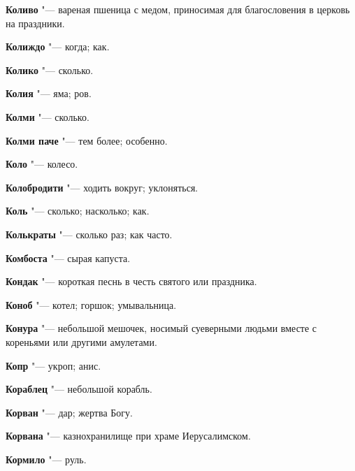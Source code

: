 \begin{mymulticols}{2}
\noindent\textbf{Коливо} "--- вареная пшеница с медом, приносимая для благословения в церковь на праздники. 




\noindent\textbf{Колиждо} "--- когда; как. 




\noindent\textbf{Колико} "--- сколько. 




\noindent\textbf{Колия} "--- яма; ров. 




\noindent\textbf{Колми} "--- сколько. 




\noindent\textbf{Колми паче} "--- тем более; особенно. 




\noindent\textbf{Коло} "--- колесо. 




\noindent\textbf{Колобродити} "--- ходить вокруг; уклоняться. 




\noindent\textbf{Коль} "--- сколько; насколько; как. 




\noindent\textbf{Колькраты} "--- сколько раз; как часто. 




\noindent\textbf{Комбоста} "--- сырая капуста. 




\noindent\textbf{Кондак} "--- короткая песнь в честь святого или праздника. 




\noindent\textbf{Коноб} "--- котел; горшок; умывальница. 




\noindent\textbf{Конура} "--- небольшой мешочек, носимый суеверными людьми вместе с кореньями или другими амулетами. 




\noindent\textbf{Копр} "--- укроп; анис. 




\noindent\textbf{Кораблец} "--- небольшой корабль. 




\noindent\textbf{Корван} "--- дар; жертва Богу. 




\noindent\textbf{Корвана} "--- казнохранилище при храме Иерусалимском. 




\noindent\textbf{Кормило} "--- руль. 





\end{mymulticols}
